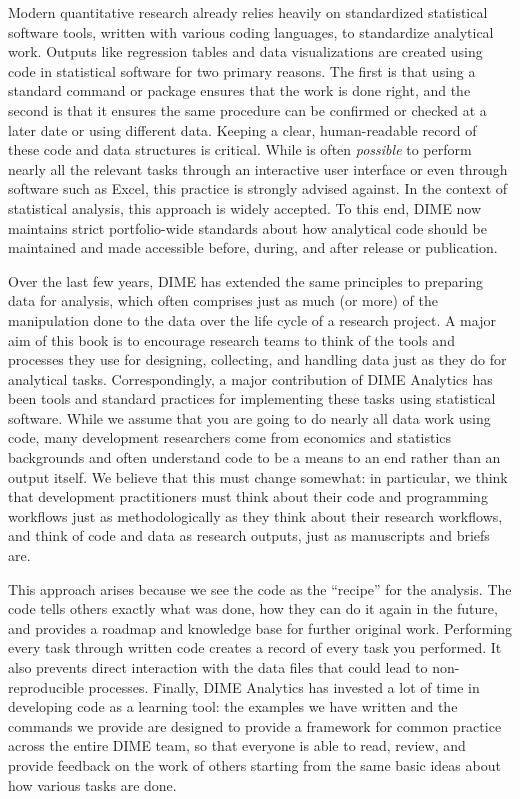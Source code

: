 Modern quantitative research already relies heavily
on standardized statistical software tools,
written with various coding languages, to standardize analytical work.
Outputs like regression tables and data visualizations
are created using code in statistical software for two primary reasons.
The first is that using a standard command or package ensures that the work is done right,
and the second is that it ensures the same procedure can be confirmed or checked
at a later date or using different data.
Keeping a clear, human-readable record of these code and data structures is critical.
While is often \textit{possible} to perform nearly all the relevant tasks
through an interactive user interface or even through software such as Excel,
this practice is strongly advised against.
In the context of statistical analysis, this approach is widely accepted.
To this end, DIME now maintains strict portfolio-wide standards
about how analytical code should be maintained and made accessible
before, during, and after release or publication.

Over the last few years, DIME has extended the same principles to preparing data for analysis,
which often comprises just as much (or more) of the manipulation done to the data
over the life cycle of a research project.
A major aim of this book is to encourage research teams
to think of the tools and processes they use
for designing, collecting, and handling data
just as they do for analytical tasks.
Correspondingly, a major contribution of DIME Analytics
has been tools and standard practices
for implementing these tasks using statistical software.
While we assume that you are going to do nearly all data work using code,
many development researchers come from economics and statistics backgrounds
and often understand code to be a means to an end rather than an output itself.
We believe that this must change somewhat:
in particular, we think that development practitioners
must think about their code and programming workflows
just as methodologically as they think about their research workflows,
and think of code and data as research outputs, just as manuscripts and briefs are.

This approach arises because we see the code as the ``recipe'' for the analysis.
The code tells others exactly what was done,
how they can do it again in the future,
and provides a roadmap and knowledge base for further original work.\cite{hamermesh2007replication}
Performing every task through written code
creates a record of every task you performed.\cite{ozier2019replication}
It also prevents direct interaction
with the data files that could lead to non-reproducible processes.\cite{chang2015economics}
Finally, DIME Analytics has invested a lot of time in developing code as a learning tool:
the examples we have written and the commands we provide
are designed to provide a framework for common practice
across the entire DIME team, so that everyone is able to
read, review, and provide feedback on the work of others
starting from the same basic ideas about how various tasks are done.

